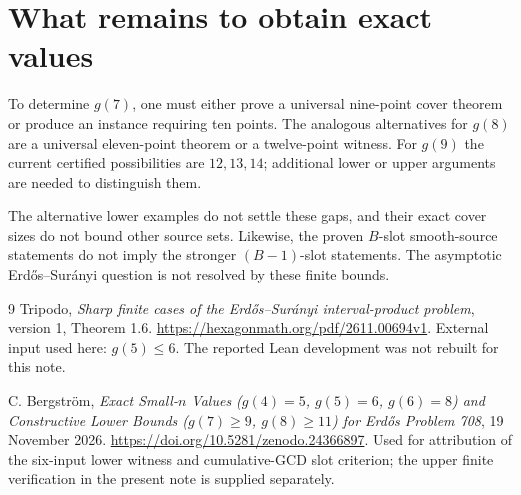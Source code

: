 \documentclass[11pt,a4paper]{article}
\begin{document}
\section{What remains to obtain exact values}
To determine $g(7)$, one must either prove a universal nine-point cover theorem or produce an instance requiring ten points. The analogous alternatives for $g(8)$ are a universal eleven-point theorem or a twelve-point witness. For $g(9)$ the current certified possibilities are $12,13,14$; additional lower or upper arguments are needed to distinguish them.

The alternative lower examples do not settle these gaps, and their exact cover sizes do not bound other source sets. Likewise, the proven $B$-slot smooth-source statements do not imply the stronger $(B-1)$-slot statements. The asymptotic Erd\H{o}s--Sur\'anyi question is not resolved by these finite bounds.

\begin{thebibliography}{9}
Tripodo, \emph{Sharp finite cases of the Erd\H{o}s--Sur\'anyi interval-product problem}, version 1, Theorem 1.6.
\url{https://hexagonmath.org/pdf/2611.00694v1}.
External input used here: $g(5)\le6$. The reported Lean development was not rebuilt for this note.

C. Bergstr\"om, \emph{Exact Small-$n$ Values ($g(4)=5$, $g(5)=6$, $g(6)=8$) and Constructive Lower Bounds ($g(7)\ge9$, $g(8)\ge11$) for Erd\H{o}s Problem 708}, 19 November 2026.
\url{https://doi.org/10.5281/zenodo.24366897}.
Used for attribution of the six-input lower witness and cumulative-GCD slot criterion; the upper finite verification in the present note is supplied separately.
\end{thebibliography}
\end{document}
